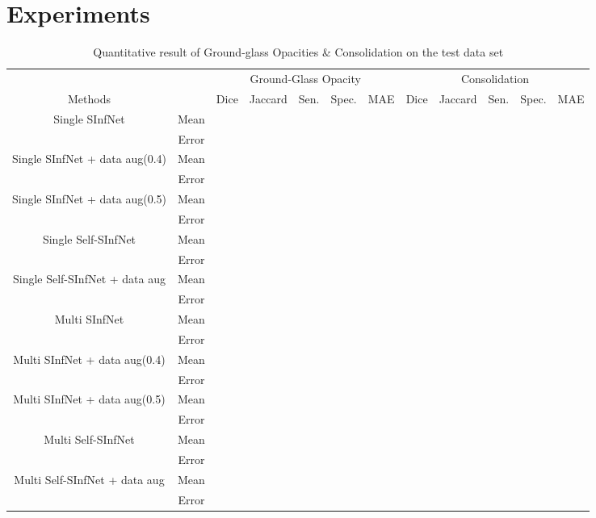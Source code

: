 \section{Experiments}

\begin{table}
	\centering
	\begin{tabular}{| c | c || c c c c c || c c c c c |}
		\hline
		& &\multicolumn{5}{c||}{Ground-Glass Opacity} & \multicolumn{5}{c|}{Consolidation}\\ \cline{3-12}
		Methods & & Dice & Jaccard & Sen. & Spec. & MAE & Dice & Jaccard & Sen. & Spec. & MAE \\\hline
		Single SInfNet & Mean & & & & & & & & & &  \\ \cline{2-12}
		& Error & & & & & & & & & &  \\ \hline \hline
		
		Single SInfNet + data aug(0.4) & Mean & & & & & & & & & &  \\ \cline{2-12}
		& Error & & & & & & & & & &  \\ \hline \hline
		
		Single SInfNet + data aug(0.5) & Mean & & & & & & & & & &  \\ \cline{2-12}
		& Error & & & & & & & & & &  \\ \hline \hline
		
		Single Self-SInfNet & Mean & & & & & & & & & &  \\ \cline{2-12}
		& Error & & & & & & & & & &  \\ \hline \hline
		
		Single Self-SInfNet + data aug & Mean & & & & & & & & & &  \\ \cline{2-12}
		& Error & & & & & & & & & &  \\ \hline \hline
		
		Multi SInfNet & Mean & & & & & & & & & &  \\ \cline{2-12}
		& Error & & & & & & & & & &  \\ \hline \hline
		
		Multi SInfNet + data aug(0.4) & Mean & & & & & & & & & &  \\ \cline{2-12}
		& Error & & & & & & & & & &  \\ \hline \hline
		
		Multi SInfNet + data aug(0.5) & Mean & & & & & & & & & &  \\ \cline{2-12}
		& Error & & & & & & & & & &  \\ \hline \hline
		
		Multi Self-SInfNet & Mean & & & & & & & & & &  \\ \cline{2-12}
		& Error & & & & & & & & & &  \\ \hline \hline
		
		Multi Self-SInfNet + data aug & Mean & & & & & & & & & &  \\ \cline{2-12}
		& Error & & & & & & & & & &  \\ \hline \hline
	\end{tabular}
	\caption{Quantitative result of Ground-glass Opacities \& Consolidation on the test data set}
\end{table}

